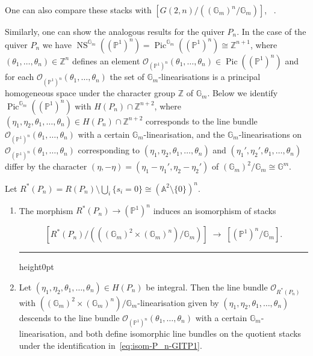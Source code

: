 \documentclass[ALCO,ThmDefs,Unicode,epreuves]{cedram}
\def\Z{\mathds Z}
\def\A{\mathds A}
\def\G{\mathds G}
\def\P{\mathds P}
\def\O{\mathcal O}
\newenvironment{equationi}{\par\noindent\vspace*{\abovedisplayskip}\begin{minipage}{\linewidth}
\begin{equation}}{\end{equation}\end{minipage}\hrule height0pt\leavevmode}
\DeclareMathOperator{\Pic}{Pic}
\DeclareMathOperator{\NS}{NS}
\begin{document}
One can also compare these stacks with $[G(2,n)/((\G_m)^n/\G_m)]$,
\cf~\cite[2.4]{Ka93a}.


Similarly, one can show the analogous results for the quiver $P_n$.
In the case of the quiver $P_n$ we have
$\NS^{\G_m}((\P^1)^n)=\Pic^{\G_m}((\P^1)^n)\cong\Z^{n+1}$, 
where $(\theta_1,\dots,\theta_n)\in\Z^n$ defines an element
$\O_{(\P^1)^n}(\theta_1,\ldots,\theta_n)\in\Pic((\P^1)^n)$ and
for each $\O_{(\P^1)^n}(\theta_1,\ldots,\theta_n)$ the set of $\G_m$-linearisations
is a principal homogeneous space under the character group $\Z$ of $\G_m$.
Below we identify $\Pic^{\G_m}((\P^1)^n)$ with $H(P_n)\cap\Z^{n+2}$, where
$(\eta_1,\eta_2,\theta_1,\ldots,\theta_n)\in H(P_n)\cap\Z^{n+2}$ corresponds 
to the line bundle $\O_{(\P^1)^n}(\theta_1,\ldots,\theta_n)$ with a certain
$\G_m$-linearisation, and the $\G_m$-linearisations on 
$\O_{(\P^1)^n}(\theta_1,\ldots,\theta_n)$ corresponding 
to $(\eta_1,\eta_2,\theta_1,\ldots,\theta_n)$ and 
$(\eta_1',\eta_2',\theta_1,\ldots,\theta_n)$ differ by the character
$(\eta,-\eta)=(\eta_1-\eta_1',\eta_2-\eta_2')$ of $(\G_m)^2/\G_m\cong\G^m$.

\begin{prop}\label{prop:P_n-GITP1}
Let $R^*(P_n)=R(P_n)\setminus\bigcup_i\{s_i=0\}\cong(\A^2\setminus\{0\})^n$.%

\begin{enumerate}[label=(\alph*)]
\item\label{prop2.11_a} 
The morphism $R^*(P_n)\to(\P^1)^n$ induces an isomorphism of stacks
\begin{equationi}\label{eq:isom-P_n-GITP1}
[R^*(P_n)/(((\G_m)^2\times(\G_m)^n)/\G_m)]\;\to\;[(\P^1)^n/\G_m].
\end{equationi}

\item\label{prop2.11_b} 
Let $(\eta_1,\eta_2,\theta_1,\ldots,\theta_n)\in H(P_n)$ be integral. 
Then the line bundle $\O_{R^*(P_n)}$ with
$((\G_m)^2\times(\G_m)^n)/\G_m$-linearisation
given by $(\eta_1,\eta_2,\theta_1,\ldots,\theta_n)$ descends to the line bundle 
$\O_{(\P^1)^n}(\theta_1,\ldots,\theta_n)$ with a certain $\G_m$-linearisation, and both 
define isomorphic line bundles on the quotient stacks under the identification 
in~\eqref{eq:isom-P_n-GITP1}.
\end{enumerate}
\end{prop}
\end{document}
